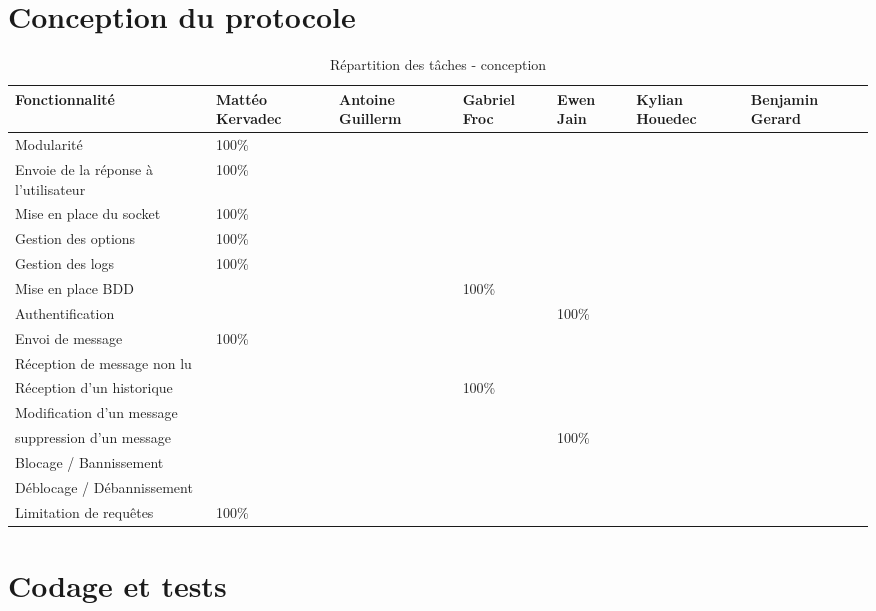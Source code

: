 \documentclass{report}
\begin{document}
\chapter{Conception du protocole}

\begin{table}[ht]
\hspace{-1cm}  %
\begin{tabular}{|p{3cm}|p{2cm}|p{2cm}|p{2cm}|p{2cm}|p{2cm}|p{2cm}|}
\hline
\textbf{Fonctionnalité} & \textbf{Mattéo Kervadec} & \textbf{Antoine Guillerm} & \textbf{Gabriel Froc} & \textbf{Ewen Jain} & \textbf{Kylian Houedec} & \textbf{Benjamin Gerard} \\
\hline
Modularité & 100\% & & & & & \\
\hline
Envoie de la réponse à l'utilisateur & 100\% & & & & & \\
\hline
Mise en place du socket & 100\% & & & & & \\
\hline
Gestion des options & 100\% & & & & & \\
\hline
Gestion des logs & 100\% & & & & & \\
\hline
Mise en place BDD & & & 100\% & & & \\
\hline
Authentification & & & & 100\% & & \\
\hline
Envoi de message & 100\% & & & & & \\
\hline
Réception de message non lu & & & & & & \\
\hline
Réception d'un historique & & & 100\% & & & \\
\hline
Modification d'un message & & & & & & \\
\hline
suppression d'un message & & & & 100\% & & \\
\hline
Blocage / Bannissement & & & & & & \\
\hline
Déblocage / Débannissement &  & & & & & \\
\hline
Limitation de requêtes & 100\% & & & & & \\
\hline
\end{tabular}
\caption{Répartition des tâches - conception}
\end{table}

\chapter{Codage et tests}
\end{document}
